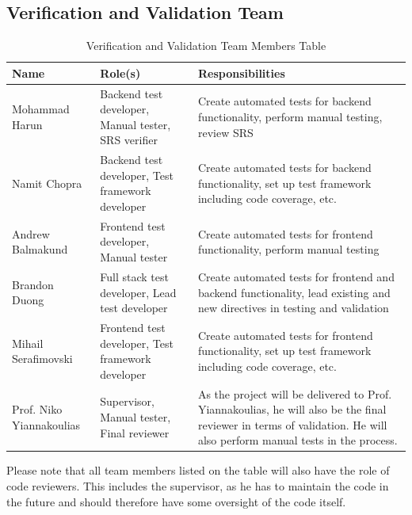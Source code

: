 \documentclass[12pt, titlepage]{article}
\begin{document}
\subsection{Verification and Validation Team}

\begin{table}[H]
\caption{Verification and Validation Team Members Table}
\begin{adjustwidth}{-2cm}{-2cm}
\centering
\begin{tabular}{|l|p{1.8in}|p{2.5in}|}
\hline
\textbf{Name}            & \textbf{Role(s)}                                       & \textbf{Responsibilities}                                                                                                                                             \\ \hline
Mohammad Harun           & Backend test developer, Manual tester, SRS verifier               & Create automated tests for backend functionality, perform manual testing, review SRS                                                                                              \\ \hline
Namit Chopra             & Backend test developer, Test framework developer       & Create automated tests for backend functionality, set up test framework including code coverage, etc.                                                                 \\ \hline
Andrew Balmakund         & Frontend test developer, Manual tester                 & Create automated tests for frontend functionality, perform manual testing                                                                                             \\ \hline
Brandon Duong            & Full stack test developer, Lead test developer         & Create automated tests for frontend and backend functionality, lead existing and new directives in testing and validation                                             \\ \hline
Mihail Serafimovski      & Frontend test developer, Test framework developer      & Create automated tests for frontend functionality, set up test framework including code coverage, etc.                                                                \\ \hline
Prof. Niko Yiannakoulias & Supervisor, Manual tester, Final reviewer & As the project will be delivered to Prof. Yiannakoulias, he will also be the final reviewer in terms of validation. He will also perform manual tests in the process. \\ \hline
\end{tabular}
\end{adjustwidth}
\end{table}
Please note that all team members listed on the table will also have the role of code reviewers. This includes the supervisor, as he has to maintain the code in the future and should therefore have some oversight of the code itself.
\end{document}
